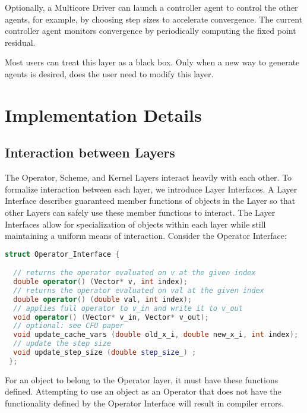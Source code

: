 Optionally, a Multicore Driver can launch a controller agent to control the other agents, for example, by choosing step sizes to accelerate convergence.
The current controller agent monitors convergence by periodically computing the fixed point residual.

Most users can treat this layer as a black box. Only when a new way to generate agents is desired, does the user need to modify this layer.

\section{Implementation Details}\label{sc:implement}

\subsection{Interaction between Layers}

The Operator, Scheme, and Kernel Layers interact heavily with each other. To formalize interaction between each layer, we introduce Layer Interfaces. A Layer Interface describes guaranteed member functions of objects in the Layer so that other Layers can safely use these member functions to interact. The Layer Interfaces allow for specialization of objects within each layer while still maintaining a uniform means of interaction. Consider the Operator Interface:
\begin{lstlisting}[language=C++,label={Operator_Interface}]
struct Operator_Interface {

  // returns the operator evaluated on v at the given index
  double operator() (Vector* v, int index);
  // returns the operator evaluated on val at the given index
  double operator() (double val, int index);
  // applies full operator to v_in and write it to v_out
  void operator() (Vector* v_in, Vector* v_out);
  // optional: see CFU paper
  void update_cache_vars (double old_x_i, double new_x_i, int index);
  // update the step size
  void update_step_size (double step_size_) ;
 };
\end{lstlisting}

For an object to belong to the Operator layer, it must have these functions defined.
Attempting to use an object as an Operator that does not have the functionality defined by the Operator Interface will result in compiler errors.

